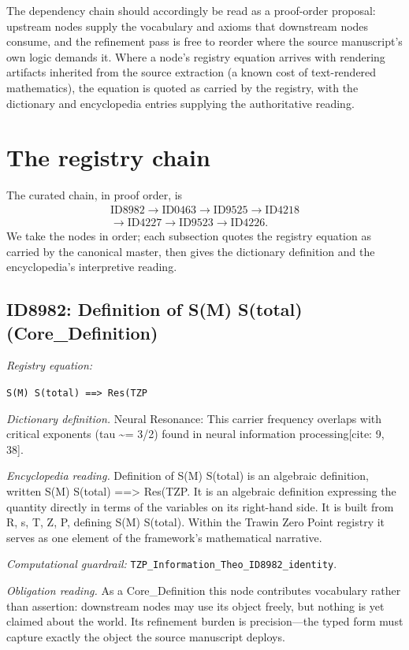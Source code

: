 \documentclass[11pt]{article}
\theoremstyle{remark}
\begin{document}
The dependency chain should accordingly be read as a proof-order proposal: upstream nodes supply the vocabulary and axioms that downstream nodes consume, and the refinement pass is free to reorder where the source manuscript's own logic demands it. Where a node's registry equation arrives with rendering artifacts inherited from the source extraction (a known cost of text-rendered mathematics), the equation is quoted as carried by the registry, with the dictionary and encyclopedia entries supplying the authoritative reading.

\section{The registry chain}
\label{sec:chain}

The curated chain, in proof order, is
\begin{equation*}
\begin{gathered}
\text{ID8982} \to \text{ID0463} \to \text{ID9525} \to \text{ID4218} \\
\to \text{ID4227} \to \text{ID9523} \to \text{ID4226}.
\end{gathered}
\end{equation*}
We take the nodes in order; each subsection quotes the registry equation as carried by the canonical master, then gives the dictionary definition and the encyclopedia's interpretive reading.

\subsection{ID8982: Definition of S(M) S(total) (Core\_Definition)}

\noindent\textit{Registry equation:}\par
{\small\texttt{S(M) S(total) ==> Res(TZP}}\par\medskip
\noindent\textit{Dictionary definition.} Neural Resonance: This carrier frequency overlaps with critical exponents (tau \textasciitilde{}= 3/2) found in neural information processing[cite: 9, 38].\par\medskip
\noindent\textit{Encyclopedia reading.} Definition of S(M) S(total) is an algebraic definition, written S(M) S(total) ==> Res(TZP. It is an algebraic definition expressing the quantity directly in terms of the variables on its right-hand side. It is built from R, s, T, Z, P, defining S(M) S(total). Within the Trawin Zero Point registry it serves as one element of the framework's mathematical narrative.
\par\medskip\noindent\textit{Computational guardrail:} \texttt{TZP\_Information\_Theo\_ID8982\_identity}.
\par\medskip\noindent\textit{Obligation reading.} As a Core\_Definition this node contributes vocabulary rather than assertion: downstream nodes may use its object freely, but nothing is yet claimed about the world. Its refinement burden is precision---the typed form must capture exactly the object the source manuscript deploys.
\end{document}
